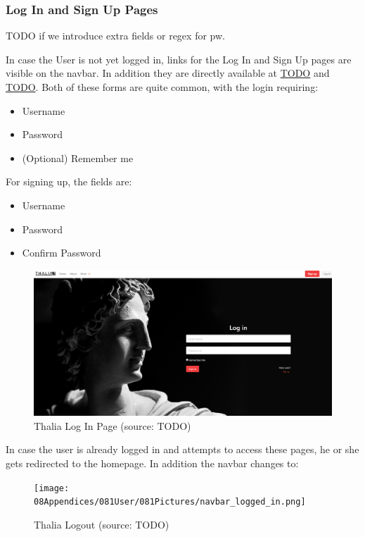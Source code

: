\documentclass[main.tex]{subfiles}
\begin{document}
\subsubsection{Log In and Sign Up Pages}

TODO if we introduce extra  fields or regex for pw.

In case the User is not yet logged in, links for the Log In and Sign Up pages are visible on the navbar. In addition they are directly available at \url{TODO} and \url{TODO}.
Both of these forms are quite common, with the login requiring:

\begin{itemize}
    \item Username
    \item Password
    \item (Optional) Remember me
\end{itemize}

For signing up, the fields are:

\begin{itemize}
    \item Username
    \item Password
    \item Confirm Password
\end{itemize}

\begin{figure}[H]
   \centering
   \includegraphics[width=\textwidth]{08Appendices/081User/081Pictures/login.png}
   \caption{Thalia Log In Page (source: TODO)}
   \label{thalia_login}
\end{figure}

In case the user is already logged in and attempts to access these pages, he or she gets redirected to the homepage. In addition the navbar changes to:

\begin{figure}[H]
   \centering
   \texttt{[image: 08Appendices/081User/081Pictures/navbar\_logged\_in.png]}
   \caption{Thalia Logout (source: TODO)}
   \label{thalia_navbar_logged_in}
\end{figure}
\end{document}
